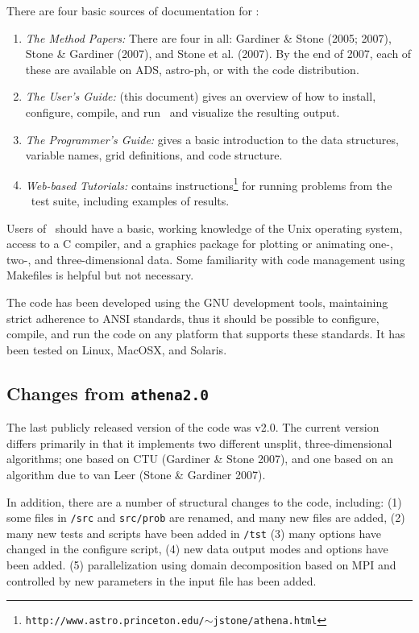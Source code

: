 There are four basic sources of documentation for \ath:
\begin{enumerate}

\item {\it The Method Papers:} There are four in all: Gardiner \& Stone
(2005; 2007), Stone \& Gardiner (2007), and Stone et al. (2007).  By the
end of 2007, each of these are available on ADS, astro-ph, or with the
code distribution.

\item {\it The User's Guide:} (this document) gives an overview of how to
install, configure, compile, and run \ath\ and visualize the resulting output.

\item {\it The Programmer's Guide:} gives a basic introduction to the 
data structures, variable names, grid definitions, and code structure.

\item {\it Web-based Tutorials:} contains
instructions\footnote{{\tt http://www.astro.princeton.edu/$\sim$jstone/athena.html}}
for running problems from the \ath\ test suite, including examples of results.

\end{enumerate}
Users of \ath\ should have a basic, working knowledge of the Unix
operating system, access to a C compiler, and a graphics package for
plotting or animating one-, two-, and three-dimensional data.  Some familiarity
with code management using Makefiles is helpful but not necessary.

The code has been developed using the GNU development tools,
maintaining strict adherence to ANSI standards, thus it should be possible
to configure, compile, and run the code on any platform that supports these
standards.  It has been tested on Linux, MacOSX, and Solaris.

\subsection{Changes from {\tt athena2.0}}

The last publicly released version of the code was v2.0.  The current
version differs primarily in that it implements two different unsplit,
three-dimensional algorithms; one based on CTU (Gardiner \& Stone 2007),
and one based on an algorithm due to van Leer (Stone \& Gardiner 2007).

In addition, there are a number of structural changes to the code, including:
(1) some files in {\tt /src} and {\tt src/prob} are renamed, and many new files are added,
(2) many new tests and scripts have been added in {\tt /tst}
(3) many options have changed in the configure script,
(4) new data output modes and options have been added.
(5) parallelization using domain decomposition based on MPI and controlled
by new parameters in the input file has been added.

